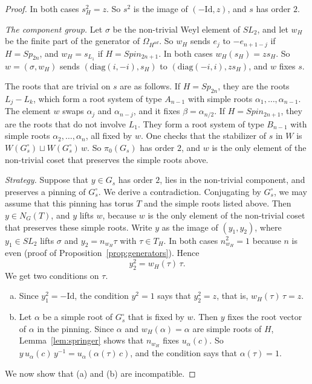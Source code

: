 \documentclass[psamsfonts]{amsart}
\theoremstyle{definition}
\theoremstyle{remark}
\numberwithin{equation}{section}
\newcommand{\diag}{\text{diag}}
\numberwithin{equation}{section}
\newcommand{\Om}{\Omega}
\newcommand{\Id}{\mathrm{Id}}
\theoremstyle{plain}
\begin{document}
\begin{proof}
In both cases $s_H^2=z$. So $s^2$ is the image of $(-\Id,z)$, and $s$ has order $2$.

\emph{The component group.} Let $\sigma$ be the non-trivial Weyl element of $SL_2$, and let $w_H$ be the finite part of the generator of $\Om_{H^{ad}}$. So $w_H$ sends $e_j$ to $-e_{n+1-j}$ if $H=Sp_{2n}$, and $w_H=s_{L_1}$ if $H=Spin_{2n+1}$. In both cases $w_H(s_H)=zs_H$. So $w=(\sigma,w_H)$ sends $(\diag(i,-i),s_H)$ to $(\diag(-i,i),zs_H)$, and $w$ fixes $s$.

The roots that are trivial on $s$ are as follows. If $H=Sp_{2n}$, they are the roots $L_j-L_k$, which form a root system of type $A_{n-1}$ with simple roots $\alpha_1,\dots,\alpha_{n-1}$. The element $w$ swaps $\alpha_j$ and $\alpha_{n-j}$, and it fixes $\beta=\alpha_{n/2}$. If $H=Spin_{2n+1}$, they are the roots that do not involve $L_1$. They form a root system of type $B_{n-1}$ with simple roots $\alpha_2,\dots,\alpha_n$, all fixed by $w$. One checks that the stabilizer of $s$ in $W$ is $W(G_s^{\circ})\sqcup W(G_s^{\circ})\,w$. So $\pi_0(G_s)$ has order $2$, and $w$ is the only element of the non-trivial coset that preserves the simple roots above.

\emph{Strategy.} Suppose that $y\in G_s$ has order $2$, lies in the non-trivial component, and preserves a pinning of $G_s^{\circ}$. We derive a contradiction. Conjugating by $G_s^{\circ}$, we may assume that this pinning has torus $T$ and the simple roots listed above. Then $y\in N_G(T)$, and $y$ lifts $w$, because $w$ is the only element of the non-trivial coset that preserves these simple roots. Write $y$ as the image of $(y_1,y_2)$, where $y_1\in SL_2$ lifts $\sigma$ and $y_2=n_{w_H}\tau$ with $\tau\in T_H$. In both cases $n_{w_H}^2=1$ because $n$ is even (proof of Proposition~\ref{prop:generators}). Hence
\[
y_2^2=w_H(\tau)\,\tau.
\]
We get two conditions on $\tau$.
\begin{enumerate}[(a)]
\item Since $y_1^2=-\Id$, the condition $y^2=1$ says that $y_2^2=z$, that is, $w_H(\tau)\,\tau=z$.
\item Let $\alpha$ be a simple root of $G_s^{\circ}$ that is fixed by $w$. Then $y$ fixes the root vector of $\alpha$ in the pinning. Since $\alpha$ and $w_H(\alpha)=\alpha$ are simple roots of $H$, Lemma~\ref{lem:springer} shows that $n_{w_H}$ fixes $u_\alpha(c)$. So $y\,u_\alpha(c)\,y^{-1}=u_\alpha(\alpha(\tau)\,c)$, and the condition says that $\alpha(\tau)=1$.
\end{enumerate}
We now show that (a) and (b) are incompatible.


\end{proof}
\end{document}
